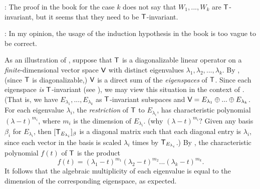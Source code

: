 \begin{note}
\RED{*}: The proof in the book for the case \(k\) does not say that \(W_1, ..., W_k\) are \(\textsf{T}\)-invariant, but it seems that they need to be \(\textsf{T}\)-invariant.

\RED{**}: In my opinion, the usage of the induction hypothesis in the book is too vague to be correct.
\end{note}

\begin{remark} \label{remark 5.4.4}
As an illustration of , suppose that \(\textsf{T}\) is a diagonalizable linear operator on a \emph{finite}-dimensional vector space \(\textsf{V}\) with distinct eigenvalues \(\lambda_1, \lambda_2, ..., \lambda_k\).
By , (since \(\textsf{T}\) is diagonalizable,) \(\textsf{V}\) is a direct sum of the \emph{eigenspaces} of \(\textsf{T}\).
Since each eigenspace \emph{is} \(\textsf{T}\)-invariant (see ), we may view this situation in the context of .
(That is, we have \(E_{\lambda_1}, ..., E_{\lambda_k}\) as \(\textsf{T}\)-invariant subspaces and \(\textsf{V} = E_{\lambda_1} \oplus ... \oplus E_{\lambda_k}\).
For each eigenvalue \(\lambda_i\), the \emph{restriction} of \(\textsf{T}\) to \(E_{\lambda_i}\), has characteristic polynomial \((\lambda - t)^{m_i}\), where \(m_i\) is the dimension of \(E_{\lambda_i}\).
(why \((\lambda - t)^{m_i}\)? Given any basis \(\beta_i\) for \(E_{\lambda_i}\), then \([\textsf{T}_{E_{\lambda_i}}]_{\beta}\) is a diagonal matrix such that each diagonal entry is \(\lambda_i\), since each vector in the basis is scaled \(\lambda_i\) times by \(\textsf{T}_{E_{\lambda_i}}\).)
By , the characteristic polynomial \(f(t)\) of \(\textsf{T}\) is the product
\[
    f(t) = (\lambda_1 - t)^{m_1} (\lambda_2 - t)^{m_2} ... (\lambda_k - t)^{m_k}.
\]
It follows that the algebraic multiplicity of each eigenvalue is equal to the dimension of the corresponding eigenspace, as expected.
\end{remark}

